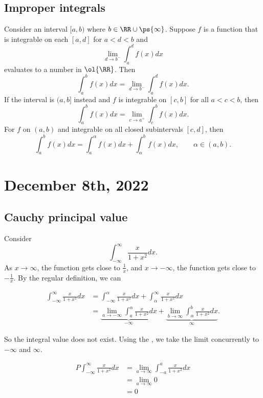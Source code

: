 \documentclass[11pt]{scrartcl}
\numberwithin{equation}{section}
\begin{document}
\subsection{Improper integrals}

Consider an interval $[a,b)$ where $b\in \RR\cup\ps{\infty}$. 
Suppose $f$ is a function that is integrable on each $[a,d]$ 
for $a<d<b$ and 
\[
    \lim_{d\rightarrow b^-}\int_{a}^{d}f(x)dx 
\]
evaluates to a number in $\ol{\RR}$.
Then 
\[
    \int_{a}^{b}f(x)dx = \lim_{d\rightarrow b^-}\int_{a}^{d}f(x)dx.
\]
If the interval is $(a,b]$ instead and $f$ is integrable on $[c,b]$ for all $a<c<b$, then 
\[
    \int_{a}^{b}f(x)dx = \lim_{c\rightarrow a^+}\int_{c}^{b}f(x)dx.
\]
For $f$ on $(a,b)$ and integrable on all closed subintervals $[c,d]$,
then 
\[
    \int_{a}^{b}f(x)dx = \int_{a}^{\alpha}f(x)dx + \int_{\alpha}^{b}f(x)dx, \qquad \alpha\in(a,b).
\]
\clearpage

\section{December 8th, 2022}

\subsection{Cauchy principal value}

Consider 
\[
    \int_{-\infty}^{\infty}\frac{x}{1+x^2}dx. 
\]
As $x\to \infty$, the function gets close to $\frac{1}{x}$, and 
$x\to-\infty$, the function gets close to $-\frac{1}{x}$.
By the regular definition, we can 

\begin{align*}
    \int_{-\infty}^{\infty}\frac{x}{1+x^2}dx &= \int_{-\infty}^{\alpha}\frac{x}{1+x^2}dx + \int_{\alpha}^{\infty}\frac{x}{1+x^2}dx \\ 
    &= \underbrace{\lim_{a\rightarrow -\infty}\int_{a}^{\alpha}\frac{x}{1+x^2}dx}_{-\infty} +
    \underbrace{\lim_{b\rightarrow \infty}\int_{\alpha}^{b}\frac{x}{1+x^2}dx}_\infty.
\end{align*}

So the integral value does not exist. Using the , we take the limit concurrently to $-\infty$ and $\infty$.

\begin{align*}
    P \int_{-\infty}^{\infty}\frac{x}{1+x^2}dx &= \lim_{a\rightarrow \infty}\int_{-a}^{a}\frac{x}{1+x^2}dx\\ 
    &= \lim_{a\rightarrow \infty}0\\
    &= 0
\end{align*}
\end{document}
